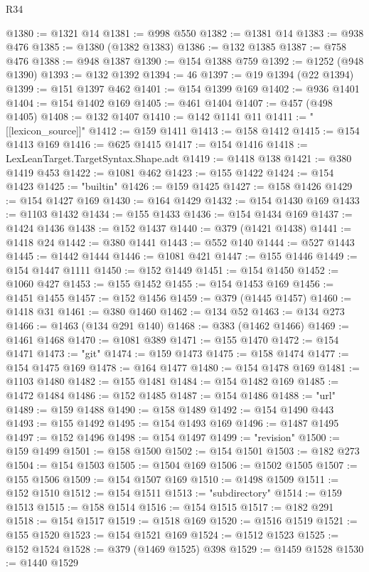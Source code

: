 \begin{lexlean}{R34}
\begin{coremodule}
@1380 := @1321 @14
@1381 := @998 @550
@1382 := @1381 @14
@1383 := @938 @476
@1385 := @1380 (@1382 @1383)
@1386 := @132 @1385
@1387 := @758 @476
@1388 := @948 @1387
@1390 := @154 @1388 @759
@1392 := @1252 (@948 @1390)
@1393 := @132 @1392
@1394 := 46
@1397 := @19 @1394 (@22 @1394)
@1399 := @151 @1397 @462
@1401 := @154 @1399 @169
@1402 := @936 @1401
@1404 := @154 @1402 @169
@1405 := @461 @1404
@1407 := @457 (@498 @1405)
@1408 := @132 @1407
@1410 := @142 @1141 @11
@1411 := "[[lexicon_source]]"
@1412 := @159 @1411
@1413 := @158 @1412
@1415 := @154 @1413 @169
@1416 := @625 @1415
@1417 := @154 @1416
@1418 := LexLeanTarget.TargetSyntax.Shape.adt
@1419 := @1418 @138
@1421 := @380 @1419 @453
@1422 := @1081 @462
@1423 := @155 @1422
@1424 := @154 @1423
@1425 := "builtin"
@1426 := @159 @1425
@1427 := @158 @1426
@1429 := @154 @1427 @169
@1430 := @164 @1429
@1432 := @154 @1430 @169
@1433 := @1103 @1432
@1434 := @155 @1433
@1436 := @154 @1434 @169
@1437 := @1424 @1436
@1438 := @152 @1437
@1440 := @379 (@1421 @1438)
@1441 := @1418 @24
@1442 := @380 @1441
@1443 := @552 @140
@1444 := @527 @1443
@1445 := @1442 @1444
@1446 := @1081 @421
@1447 := @155 @1446
@1449 := @154 @1447 @1111
@1450 := @152 @1449
@1451 := @154 @1450
@1452 := @1060 @427
@1453 := @155 @1452
@1455 := @154 @1453 @169
@1456 := @1451 @1455
@1457 := @152 @1456
@1459 := @379 (@1445 @1457)
@1460 := @1418 @31
@1461 := @380 @1460
@1462 := @134 @52
@1463 := @134 @273
@1466 := @1463 (@134 @291 @140)
@1468 := @383 (@1462 @1466)
@1469 := @1461 @1468
@1470 := @1081 @389
@1471 := @155 @1470
@1472 := @154 @1471
@1473 := "git"
@1474 := @159 @1473
@1475 := @158 @1474
@1477 := @154 @1475 @169
@1478 := @164 @1477
@1480 := @154 @1478 @169
@1481 := @1103 @1480
@1482 := @155 @1481
@1484 := @154 @1482 @169
@1485 := @1472 @1484
@1486 := @152 @1485
@1487 := @154 @1486
@1488 := "url"
@1489 := @159 @1488
@1490 := @158 @1489
@1492 := @154 @1490 @443
@1493 := @155 @1492
@1495 := @154 @1493 @169
@1496 := @1487 @1495
@1497 := @152 @1496
@1498 := @154 @1497
@1499 := "revision"
@1500 := @159 @1499
@1501 := @158 @1500
@1502 := @154 @1501
@1503 := @182 @273
@1504 := @154 @1503
@1505 := @1504 @169
@1506 := @1502 @1505
@1507 := @155 @1506
@1509 := @154 @1507 @169
@1510 := @1498 @1509
@1511 := @152 @1510
@1512 := @154 @1511
@1513 := "subdirectory"
@1514 := @159 @1513
@1515 := @158 @1514
@1516 := @154 @1515
@1517 := @182 @291
@1518 := @154 @1517
@1519 := @1518 @169
@1520 := @1516 @1519
@1521 := @155 @1520
@1523 := @154 @1521 @169
@1524 := @1512 @1523
@1525 := @152 @1524
@1528 := @379 (@1469 @1525) @398
@1529 := @1459 @1528
@1530 := @1440 @1529

\end{coremodule}
\end{lexlean}
